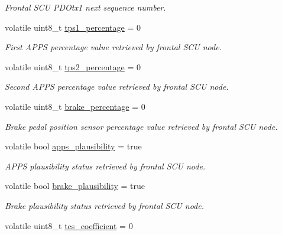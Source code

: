 \begin{DoxyCompactItemize}
\begin{DoxyCompactList}\small\item\em Frontal S\-C\-U P\-D\-Otx1 next sequence number. \end{DoxyCompactList}\item 
volatile uint8\-\_\-t \hyperlink{group___c_a_n__servizi__group_ga1d42f28ccf027a3243fad064fa47ef81}{tps1\-\_\-percentage} = 0
\begin{DoxyCompactList}\small\item\em First A\-P\-P\-S percentage value retrieved by frontal S\-C\-U node. \end{DoxyCompactList}\item 
volatile uint8\-\_\-t \hyperlink{group___c_a_n__servizi__group_gaf69d82f83885abc5adbd5fcbf4c421cf}{tps2\-\_\-percentage} = 0
\begin{DoxyCompactList}\small\item\em Second A\-P\-P\-S percentage value retrieved by frontal S\-C\-U node. \end{DoxyCompactList}\item 
volatile uint8\-\_\-t \hyperlink{group___c_a_n__servizi__group_ga8e50a30864da7026531520887968d4c0}{brake\-\_\-percentage} = 0
\begin{DoxyCompactList}\small\item\em Brake pedal position sensor percentage value retrieved by frontal S\-C\-U node. \end{DoxyCompactList}\item 
\hypertarget{group___c_a_n__servizi__group_gaa9de48f5a49bc92a608ed315c087f3a6}{volatile bool \hyperlink{group___c_a_n__servizi__group_gaa9de48f5a49bc92a608ed315c087f3a6}{apps\-\_\-plausibility} = true}\label{group___c_a_n__servizi__group_gaa9de48f5a49bc92a608ed315c087f3a6}

\begin{DoxyCompactList}\small\item\em A\-P\-P\-S plausibility status retrieved by frontal S\-C\-U node. \end{DoxyCompactList}\item 
\hypertarget{group___c_a_n__servizi__group_gae505d69d6ac9d4e7e3c2268ca6cb20b3}{volatile bool \hyperlink{group___c_a_n__servizi__group_gae505d69d6ac9d4e7e3c2268ca6cb20b3}{brake\-\_\-plausibility} = true}\label{group___c_a_n__servizi__group_gae505d69d6ac9d4e7e3c2268ca6cb20b3}

\begin{DoxyCompactList}\small\item\em Brake plausibility status retrieved by frontal S\-C\-U node. \end{DoxyCompactList}\item 
\hypertarget{group___c_a_n__servizi__group_gac6f04deffa2553115dad7c8b45e14d8b}{volatile uint8\-\_\-t \hyperlink{group___c_a_n__servizi__group_gac6f04deffa2553115dad7c8b45e14d8b}{tcs\-\_\-coefficient} = 0}\label{group___c_a_n__servizi__group_gac6f04deffa2553115dad7c8b45e14d8b}


\end{DoxyCompactItemize}
